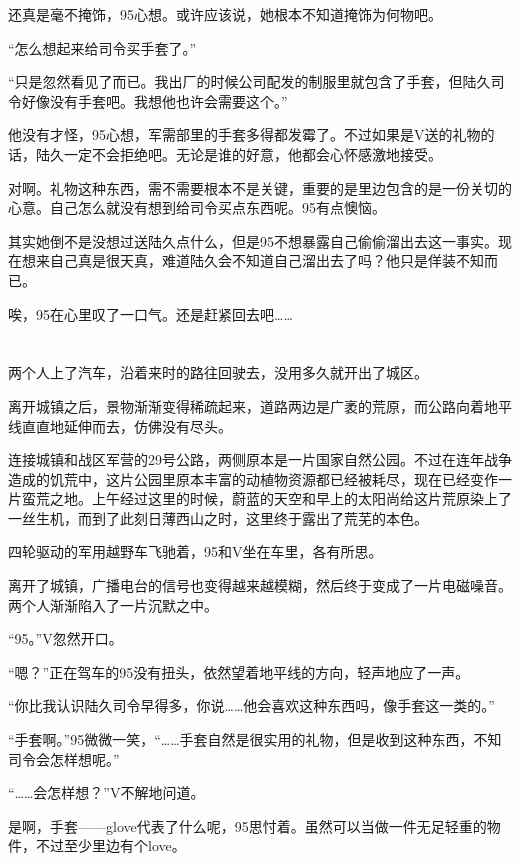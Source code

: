 还真是毫不掩饰，95心想。或许应该说，她根本不知道掩饰为何物吧。

“怎么想起来给司令买手套了。”

“只是忽然看见了而已。我出厂的时候公司配发的制服里就包含了手套，但陆久司令好像没有手套吧。我想他也许会需要这个。”

他没有才怪，95心想，军需部里的手套多得都发霉了。不过如果是V送的礼物的话，陆久一定不会拒绝吧。无论是谁的好意，他都会心怀感激地接受。

对啊。礼物这种东西，需不需要根本不是关键，重要的是里边包含的是一份关切的心意。自己怎么就没有想到给司令买点东西呢。95有点懊恼。

其实她倒不是没想过送陆久点什么，但是95不想暴露自己偷偷溜出去这一事实。现在想来自己真是很天真，难道陆久会不知道自己溜出去了吗？他只是佯装不知而已。

唉，95在心里叹了一口气。还是赶紧回去吧……



\section*{}

两个人上了汽车，沿着来时的路往回驶去，没用多久就开出了城区。

离开城镇之后，景物渐渐变得稀疏起来，道路两边是广袤的荒原，而公路向着地平线直直地延伸而去，仿佛没有尽头。

连接城镇和战区军营的29号公路，两侧原本是一片国家自然公园。不过在连年战争造成的饥荒中，这片公园里原本丰富的动植物资源都已经被耗尽，现在已经变作一片蛮荒之地。上午经过这里的时候，蔚蓝的天空和早上的太阳尚给这片荒原染上了一丝生机，而到了此刻日薄西山之时，这里终于露出了荒芜的本色。

四轮驱动的军用越野车飞驰着，95和V坐在车里，各有所思。

离开了城镇，广播电台的信号也变得越来越模糊，然后终于变成了一片电磁噪音。两个人渐渐陷入了一片沉默之中。

“95。”V忽然开口。

“嗯？”正在驾车的95没有扭头，依然望着地平线的方向，轻声地应了一声。

“你比我认识陆久司令早得多，你说……他会喜欢这种东西吗，像手套这一类的。”

“手套啊。”95微微一笑，“……手套自然是很实用的礼物，但是收到这种东西，不知司令会怎样想呢。”

“……会怎样想？”V不解地问道。

是啊，手套——glove代表了什么呢，95思忖着。虽然可以当做一件无足轻重的物件，不过至少里边有个love。

